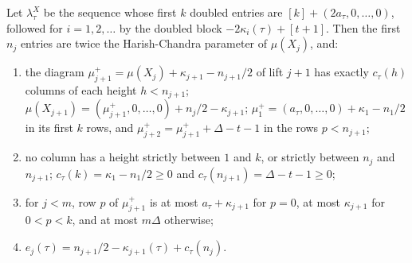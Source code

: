 \begin{proposition}\label{prop:weights-X}
Let $\lambda^X_\tau$ be the sequence whose first $k$ doubled entries are $[k]+(2a_\tau,0,\dots,0)$,
followed for $i=1,2,\dots$ by the doubled block $-2\kappa_i(\tau)+[t+1]$. Then the first $n_j$ entries
are twice the Harish-Chandra parameter of $\mu(X_j)$, and:
\begin{enumerate}[label=\textup{(\alph*)}]
\item the diagram $\mu^+_{j+1}=\mu(X_j)+\kappa_{j+1}-n_{j+1}/2$ of lift $j+1$ has exactly $c_\tau(h)$
columns of each height $h<n_{j+1}$; $\mu(X_{j+1})=(\mu^+_{j+1},0,\dots,0)+n_j/2-\kappa_{j+1}$;
$\mu^+_1=(a_\tau,0,\dots,0)+\kappa_1-n_1/2$ in its first $k$ rows, and
$\mu^+_{j+2}=\mu^+_{j+1}+\Delta-t-1$ in the rows $p<n_{j+1}$;
\item no column has a height strictly between $1$ and $k$, or strictly between $n_j$ and $n_{j+1}$;
$c_\tau(k)=\kappa_1-n_1/2\ge0$ and $c_\tau(n_{j+1})=\Delta-t-1\ge0$;
\item for $j<m$, row $p$ of $\mu^+_{j+1}$ is at most $a_\tau+\kappa_{j+1}$ for $p=0$, at most
$\kappa_{j+1}$ for $0<p<k$, and at most $m\Delta$ otherwise;
\item $e_j(\tau)=n_{j+1}/2-\kappa_{j+1}(\tau)+c_\tau(n_j)$.
\end{enumerate}
\end{proposition}

